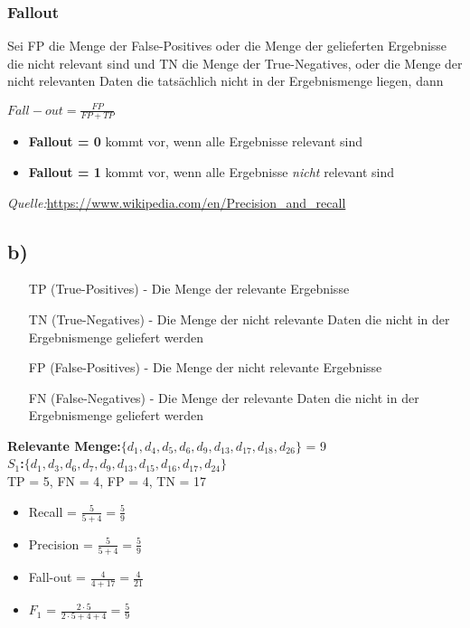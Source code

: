 \documentclass[11pt,a4paper,parskip=half ]{scrartcl}
\begin{document}
	\subsubsection*{Fallout} Sei FP die Menge der False-Positives oder die Menge
	der gelieferten Ergebnisse die nicht relevant sind und TN die Menge der
	True-Negatives, oder die Menge der nicht relevanten Daten die tatsächlich nicht
	in der Ergebnismenge liegen, dann
	\begin{center}
		$Fall-out = \frac{FP}{FP+TP}$
	\end{center}
	\begin{itemize}
		\item \textbf{Fallout = 0} kommt vor, wenn alle Ergebnisse relevant sind
		\item \textbf{Fallout = 1} kommt vor, wenn alle Ergebnisse \textit{nicht}
		relevant sind 
	\end{itemize}
	
	\textit{Quelle:}\url{https://www.wikipedia.com/en/Precision_and_recall}
	
	\subsection*{b)}
	\begin{itemize}
		\item[TP](True-Positives) - Die Menge der relevante Ergebnisse
		\item[TN](True-Negatives) - Die Menge der nicht relevante Daten die nicht in
		der Ergebnismenge geliefert werden
		\item[FP](False-Positives) - Die Menge der nicht relevante Ergebnisse
		\item[FN](False-Negatives) - Die Menge der relevante Daten die nicht in der
		Ergebnismenge geliefert werden
	\end{itemize}
	\textbf{Relevante Menge:}$\{d_{1}, d_{4}, d_{5}, d_{6}, d_{9}, d_{13}, d_{17},
	d_{18}, d_{26}\}$  = 9	\\
	
	\textbf{$S_{1}$:}$\{d_{1},d_{3},d_{6},d_{7},d_{9},d_{13},d_{15},d_{16},d_{17},d_{24}\}$
	\\
	TP = 5, FN = 4, FP = 4, TN = 17
	\begin{itemize}
		\item Recall = $\frac{5}{5+4} = \frac{5}{9}$
		\item Precision = $\frac{5}{5+4} = \frac{5}{9}$
		\item Fall-out = $\frac{4}{4+17} = \frac{4}{21}$
		\item $F_{1}$ = $\frac{2\cdot5}{2\cdot5+4+4} = \frac{5}{9}$
	\end{itemize}
	
\end{document}
